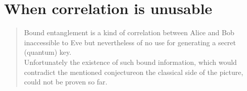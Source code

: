 \section{When correlation is unusable}
	\begin{quotation}
		Bound entanglement is a kind of correlation between Alice and Bob inaccessible to Eve but nevertheless of no use for generating a secret (quantum) key.\\
		Unfortunately the existence of such bound information, which would contradict the mentioned conjecture\footnotemark on the classical side of the picture, could not be proven so far.
	\end{quotation}
		
